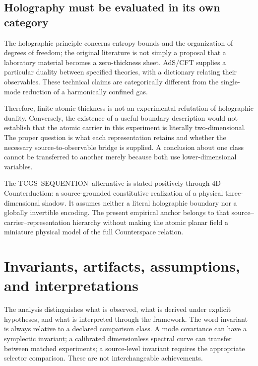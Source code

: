 \documentclass[11pt,a4paper]{article}
\theoremstyle{definition}
\theoremstyle{remark}
\newcommand{\TCGS}{TCGS--SEQUENTION}
\begin{document}
\subsection{Holography must be evaluated in its own category}
The holographic principle concerns entropy bounds and the organization of degrees of freedom; the original literature is not simply a proposal that a laboratory material becomes a zero-thickness sheet. AdS/CFT supplies a particular duality between specified theories, with a dictionary relating their observables. These technical claims are categorically different from the single-mode reduction of a harmonically confined gas.\cite{susskind,maldacena,bousso}

Therefore, finite atomic thickness is not an experimental refutation of holographic duality. Conversely, the existence of a useful boundary description would not establish that the atomic carrier in this experiment is literally two-dimensional. The proper question is what each representation retains and whether the necessary source-to-observable bridge is supplied. A conclusion about one class cannot be transferred to another merely because both use lower-dimensional variables.

The \TCGS\ alternative is stated positively through 4D-Counterduction: a source-grounded constitutive realization of a physical three-dimensional shadow. It assumes neither a literal holographic boundary nor a globally invertible encoding. The present empirical anchor belongs to that source--carrier--representation hierarchy without making the atomic planar field a miniature physical model of the full Counterspace relation.\cite{foundation}

\section{Invariants, artifacts, assumptions, and interpretations}
\label{sec:ledger}
The analysis distinguishes what is observed, what is derived under explicit hypotheses, and what is interpreted through the framework. The word invariant is always relative to a declared comparison class. A mode covariance can have a symplectic invariant; a calibrated dimensionless spectral curve can transfer between matched experiments; a source-level invariant requires the appropriate selector comparison. These are not interchangeable achievements.\cite{foundation}
\end{document}
